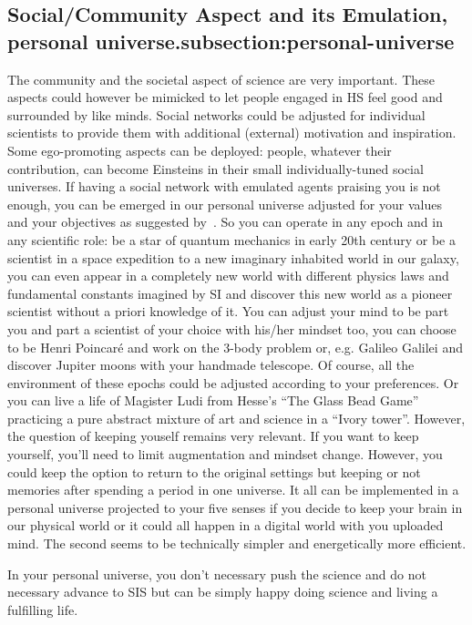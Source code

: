 \documentclass[a4paper,11pt]{article}
\begin{document}
\subsection{Social/Community Aspect and its Emulation, personal universe.{subsection:personal-universe}}
The community and the societal aspect of science are very important. These aspects could however be mimicked to let people engaged in HS feel good and surrounded by like minds. Social networks could be adjusted for individual scientists to provide them with additional (external) motivation and inspiration. Some ego-promoting aspects can be deployed: people, whatever their contribution, can become Einsteins in their small individually-tuned social universes. If having a social network with emulated agents praising you is not enough, you can be emerged in our personal universe adjusted for your values and your objectives as suggested by~\textcite{Yampolskiy2019}. So you can operate in any epoch and in any scientific role: be a star of quantum mechanics in early 20th century or be a scientist in a space expedition to a new imaginary inhabited world in our galaxy, you can even appear in a completely new world with different physics laws and fundamental constants imagined by SI and discover this new world as a pioneer scientist without a priori knowledge of it. You can adjust your mind to be part you and part a scientist of your choice with his/her mindset too, you can choose to be Henri Poincaré and work on the 3-body problem or, e.g. Galileo Galilei and discover Jupiter moons with your handmade telescope. Of course, all the environment of these epochs could be adjusted according to your preferences. Or you can live a life of Magister Ludi from Hesse's ``The Glass Bead Game'' practicing a pure abstract mixture of art and science in a ``Ivory tower''. However, the question of keeping youself remains very relevant. If you want to keep yourself, you'll need to limit augmentation and mindset change. However, you could keep the option to return to the original settings but keeping or not memories after spending a period in one universe. It all can be implemented in a personal universe projected to your five senses if you decide to keep your brain in our physical world or it could all happen in a digital world with you uploaded mind. The second seems to be technically simpler and energetically more efficient.

In your personal universe, you don't necessary push the science and do not necessary advance to SIS but can be simply happy doing science and living a fulfilling life.
\end{document}
